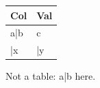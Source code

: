 \documentclass[11pt,a4paper]{article}
\begin{document}
\begin{table}[h]
\begin{tabular}{|l|l|}
\hline
Col & Val \\ \hline
a|b & c \\ \hline
|x & |y \\ \hline
\end{tabular}
\end{table}

Not a table: a|b here.
\end{document}
